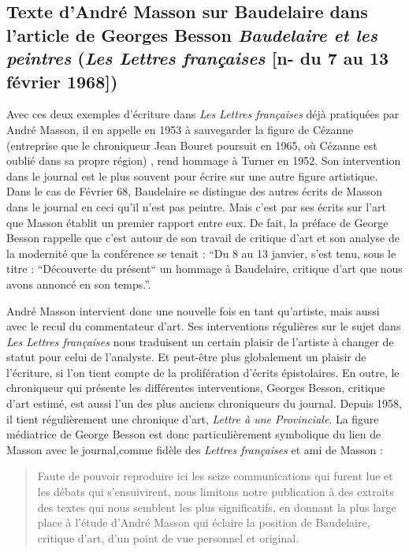 \subsection{Texte d'André Masson sur Baudelaire dans l'article de Georges Besson \emph{Baudelaire et les peintres} (\emph{Les Lettres françaises} [n- du 7 au 13 février 1968]) }


Avec ces deux exemples d’écriture dans \emph{Les Lettres françaises} déjà pratiquées par André Masson, il en appelle en 1953 à sauvegarder la figure de Cézanne (entreprise que le chroniqueur Jean Bouret poursuit en 1965, où Cézanne est oublié dans sa propre région) , rend hommage à Turner en 1952. Son intervention dans le journal est le plus souvent pour écrire sur une autre figure artistique. Dans le cas de Février 68, Baudelaire se distingue des autres écrits de Masson dans le journal en ceci qu’il n’est pas peintre. Mais c’est par ses écrits sur l’art que Masson établit un premier rapport entre eux. De fait, la préface de George Besson rappelle que c’est autour de son travail de critique d’art et son analyse de la modernité que la conférence se tenait : \enquote{Du 8 au 13 janvier, s’est tenu, sous le titre :  “Découverte du présent“ un hommage à Baudelaire, critique d’art que nous avons annoncé en son temps.}.


	 André Masson intervient donc une nouvelle fois en tant qu’artiste, mais aussi avec le recul du commentateur d’art. Ses interventions régulières sur le sujet dans \emph{Les Lettres françaises} nous traduisent un certain plaisir de l’artiste à changer de statut pour celui de l’analyste. Et peut-être plus globalement un plaisir de l’écriture, si l’on tient compte de la prolifération d’écrits épistolaires. En outre, le chroniqueur qui présente les différentes interventions, Georges Besson, critique d’art estimé, est aussi l’un des plus anciens chroniqueurs du journal. Depuis 1958, il tient régulièrement une chronique d’art, \emph{Lettre à une Provinciale}. La figure médiatrice de George Besson est donc particulièrement symbolique du lien de Masson avec le journal,comme fidèle des \emph{Lettres françaises} et ami de Masson :
\begin{quote}
Faute de pouvoir reproduire ici les seize communications qui furent lue et les débats qui s’ensuivirent, nous limitons notre publication à des extraits des textes qui nous semblent les plus significatifs, en donnant la plus large place à l’étude d’André Masson qui éclaire la position de Baudelaire, critique d’art, d’un point de vue personnel et original. 	
\end{quote}

